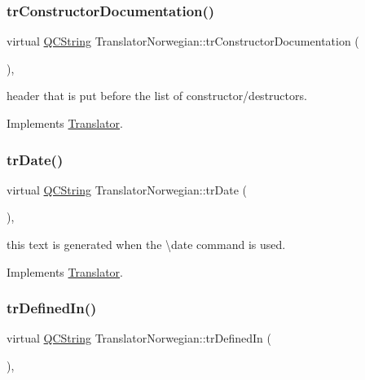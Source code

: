 \subsubsection{\texorpdfstring{trConstructorDocumentation()}{trConstructorDocumentation()}}
{\footnotesize\ttfamily virtual \mbox{\hyperlink{class_q_c_string}{Q\+C\+String}} Translator\+Norwegian\+::tr\+Constructor\+Documentation (\begin{DoxyParamCaption}{ }\end{DoxyParamCaption})\hspace{0.3cm}{\ttfamily [inline]}, {\ttfamily [virtual]}}

header that is put before the list of constructor/destructors. 

Implements \mbox{\hyperlink{class_translator}{Translator}}.

\mbox{\label{class_translator_norwegian_a5d293c6ae2efe0cfe082d73ebb4806f4}} 
\subsubsection{\texorpdfstring{trDate()}{trDate()}}
{\footnotesize\ttfamily virtual \mbox{\hyperlink{class_q_c_string}{Q\+C\+String}} Translator\+Norwegian\+::tr\+Date (\begin{DoxyParamCaption}{ }\end{DoxyParamCaption})\hspace{0.3cm}{\ttfamily [inline]}, {\ttfamily [virtual]}}

this text is generated when the \textbackslash{}date command is used. 

Implements \mbox{\hyperlink{class_translator}{Translator}}.

\mbox{\label{class_translator_norwegian_aad63bbbec277c04ed4d2e6f96e48ab3c}} 
\subsubsection{\texorpdfstring{trDefinedIn()}{trDefinedIn()}}
{\footnotesize\ttfamily virtual \mbox{\hyperlink{class_q_c_string}{Q\+C\+String}} Translator\+Norwegian\+::tr\+Defined\+In (\begin{DoxyParamCaption}{ }\end{DoxyParamCaption})\hspace{0.3cm}{\ttfamily [inline]}, {\ttfamily [virtual]}}


